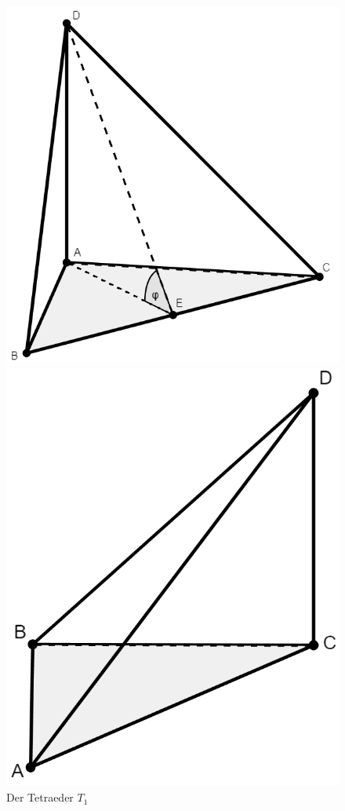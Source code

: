 \documentclass[11pt,titlepage]{article}
\theoremstyle{definition}
\theoremstyle{remark}
\begin{document}
	\begin{figure}[!htbp]
		\centering
		\begin{minipage}[m]{0.4\textwidth}
			\hspace{-1cm}
			\includegraphics[scale=0.3]{Tetraeder1}
			\caption{Der Tetraeder $T_1$}
			\label{Abb.5}
		\end{minipage}
		\begin{minipage}[m]{0.4\textwidth}
			\hspace{1cm}
			\includegraphics[scale=0.311]{Tetraeder2.1}

\end{minipage}
\end{figure}
\end{document}
